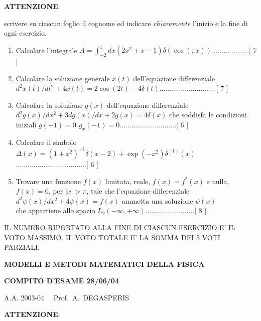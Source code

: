 \documentclass[a4paper,10pt]{article}
\begin{document}
\vspace{20pt}
\noindent
{\bf ATTENZIONE}:

\noindent
scrivere su ciascun foglio il cognome ed indicare
\emph{chiaramente} l'inizio e la fine di ogni esercizio.
\vspace{20pt}
\noindent
\begin{enumerate}
\item Calcolare l'integrale
$A=\int_{-2}^1dx(2x^2+x-1)\delta(\cos(\pi x))$...................[ 7 ] 
\item Calcolare la soluzione generale $x(t)$ dell'equazione
differenziale\\
$d^2x(t)/dt^2+4x(t)=2\cos(2t)-4\delta(t)$.............................[ 7 ]
\item Calcolare la soluzione $g(x)$ dell'equazione differenziale\\
$d^2g(x)/dx^2+3dg(x)/dx+2g(x)=4\delta(x)$ che soddisfa le
condizioni iniziali $g(-1)=0\,\ g_x(-1)=0$.............................[ 6 ]  
\item Calcolare il simbolo\\ $\Delta(x)=(1+x^2)^{-1}
\delta(x-2)+\exp(-x^2)\delta^{(1)}(x)$....................................[ 6 ]
\item Trovare una funzione $f(x)$ limitata, reale, $f(x)=f^{\ast}(x)$ e
nulla, $f(x)=0$, per $|x|>\pi$, tale che l'equazione differenziale\\
$d^2\psi(x)/dx^2+4\psi(x)=f(x)$ ammetta una soluzione $\psi(x)$\\ che
appartiene allo spazio $L_2(-\infty,+\infty)$.........................[ 8 ]

\end{enumerate}

\noindent IL NUMERO RIPORTATO ALLA FINE DI CIASCUN ESERCIZIO
E' IL VOTO MASSIMO. IL VOTO TOTALE E' LA SOMMA DEI 5 VOTI
PARZIALI.

\newpage

\centerline{\bf MODELLI E METODI MATEMATICI DELLA FISICA}

\centerline{\bf COMPITO D'ESAME 28/06/04}

\centerline{A.A. 2003-04 \ \ Prof.\ A.\ DEGASPERIS}
\vspace{20pt}
\noindent
{\bf ATTENZIONE}:
\end{document}
